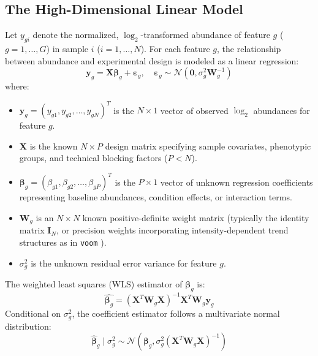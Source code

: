 \documentclass[11pt,twoside,openright]{book}
\begin{document}
\subsection{The High-Dimensional Linear Model}

Let $y_{gi}$ denote the normalized, $\log_2$-transformed abundance of feature $g$ ($g = 1, \dots, G$) in sample $i$ ($i = 1, \dots, N$). For each feature $g$, the relationship between abundance and experimental design is modeled as a linear regression:
\begin{equation}
\mathbf{y}_g = \mathbf{X} \boldsymbol{\beta}_g + \boldsymbol{\varepsilon}_g, \quad \boldsymbol{\varepsilon}_g \sim \mathcal{N}(\mathbf{0}, \sigma_g^2 \mathbf{W}_g^{-1})
\label{eq:linear_model}
\end{equation}
where:
\begin{itemize}
    \item $\mathbf{y}_g = (y_{g1}, y_{g2}, \dots, y_{gN})^T$ is the $N \times 1$ vector of observed $\log_2$ abundances for feature $g$.
    \item $\mathbf{X}$ is the known $N \times P$ design matrix specifying sample covariates, phenotypic groups, and technical blocking factors ($P < N$).
    \item $\boldsymbol{\beta}_g = (\beta_{g1}, \beta_{g2}, \dots, \beta_{gP})^T$ is the $P \times 1$ vector of unknown regression coefficients representing baseline abundances, condition effects, or interaction terms.
    \item $\mathbf{W}_g$ is an $N \times N$ known positive-definite weight matrix (typically the identity matrix $\mathbf{I}_N$, or precision weights incorporating intensity-dependent trend structures as in \texttt{voom} \cite{law2014voom}).
    \item $\sigma_g^2$ is the unknown residual error variance for feature $g$.
\end{itemize}

The weighted least squares (WLS) estimator of $\boldsymbol{\beta}_g$ is:
\begin{equation}
\hat{\boldsymbol{\beta}_g} = (\mathbf{X}^T \mathbf{W}_g \mathbf{X})^{-1} \mathbf{X}^T \mathbf{W}_g \mathbf{y}_g
\label{eq:ols_beta}
\end{equation}
Conditional on $\sigma_g^2$, the coefficient estimator follows a multivariate normal distribution:
\begin{equation}
\hat{\boldsymbol{\beta}}_g \mid \sigma_g^2 \sim \mathcal{N}\left(\boldsymbol{\beta}_g, \sigma_g^2 (\mathbf{X}^T \mathbf{W}_g \mathbf{X})^{-1}\right)
\end{equation}
\end{document}
